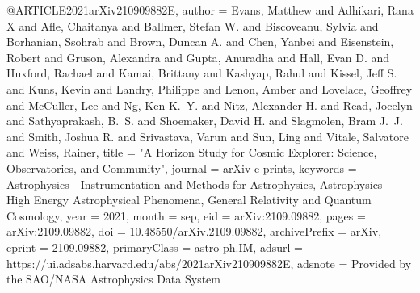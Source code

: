 @ARTICLE{2021arXiv210909882E,
       author = {{Evans}, Matthew and {Adhikari}, Rana X and {Afle}, Chaitanya and {Ballmer}, Stefan W. and {Biscoveanu}, Sylvia and {Borhanian}, Ssohrab and {Brown}, Duncan A. and {Chen}, Yanbei and {Eisenstein}, Robert and {Gruson}, Alexandra and {Gupta}, Anuradha and {Hall}, Evan D. and {Huxford}, Rachael and {Kamai}, Brittany and {Kashyap}, Rahul and {Kissel}, Jeff S. and {Kuns}, Kevin and {Landry}, Philippe and {Lenon}, Amber and {Lovelace}, Geoffrey and {McCuller}, Lee and {Ng}, Ken K.~Y. and {Nitz}, Alexander H. and {Read}, Jocelyn and {Sathyaprakash}, B.~S. and {Shoemaker}, David H. and {Slagmolen}, Bram J.~J. and {Smith}, Joshua R. and {Srivastava}, Varun and {Sun}, Ling and {Vitale}, Salvatore and {Weiss}, Rainer},
        title = "{A Horizon Study for Cosmic Explorer: Science, Observatories, and Community}",
      journal = {arXiv e-prints},
     keywords = {Astrophysics - Instrumentation and Methods for Astrophysics, Astrophysics - High Energy Astrophysical Phenomena, General Relativity and Quantum Cosmology},
         year = 2021,
        month = sep,
          eid = {arXiv:2109.09882},
        pages = {arXiv:2109.09882},
          doi = {10.48550/arXiv.2109.09882},
archivePrefix = {arXiv},
       eprint = {2109.09882},
 primaryClass = {astro-ph.IM},
       adsurl = {https://ui.adsabs.harvard.edu/abs/2021arXiv210909882E},
      adsnote = {Provided by the SAO/NASA Astrophysics Data System}
}

